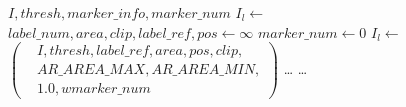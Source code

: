 \begin{algorithm}[ht]
\caption{}
\label{alg:detectmarker}
\begin{algorithmic}[1]
	\Require $I,\mathit{thresh},\mathit{marker\_info},\mathit{marker\_num}$
	\State $I_l \gets$ 
	\label{alg:detectmarker-init-start}
	\State $\mathit{label\_num},\mathit{area},\mathit{clip},\mathit{label\_ref},\mathit{pos} \gets \infty$
	\label{alg:detectmarker-init-end}
	\State {}
	\State {}
	\State $\mathit{marker\_num} \gets 0$
	\State $I_l \gets$ $\left(
	\begin{aligned}
			& I,\mathit{thresh},\mathit{label\_ref},\mathit{area},\mathit{pos},\mathit{clip},\\
			& \mathit{AR\_AREA\_MAX}, \mathit{AR\_AREA\_MIN},\\
			& 1.0, \mathit{wmarker\_num}
	\end{aligned}\right)$
	\label{alg:detectmarker-call-method}
		\label{alg:detectmarker-found-rectangle}
		\State \ldots {}
	\EndIf
	\State \ldots {}
\end{algorithmic}
\end{algorithm}
